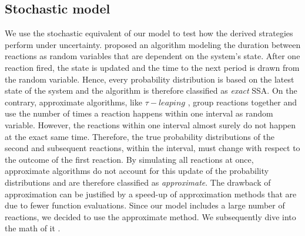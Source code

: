 \subsection{Stochastic model}
\label{sec:stochastic}
We use the stochastic equivalent of our model to test how the derived strategies perform under uncertainty. \citep{Gillespie.1977} proposed an algorithm modeling the duration between reactions as random variables that are dependent on the system's state. After one reaction fired, the state is updated and the time to the next period is drawn from the random variable. Hence, every probability distribution is based on the latest state of the system and the algorithm is therefore classified as \textit{exact} SSA.  
On the contrary, approximate algorithms, like $\tau-leaping$ \citep{Gillespie.2001}, group reactions together and use the number of times a reaction happens within one interval as random variable. However, the reactions within one interval almost surely do not happen at the exact same time. Therefore, the true probability distributions of the second and subsequent reactions, within the interval, must change with respect to the outcome of the first reaction. By simulating all reactions at once, approximate algorithms do not account for this update of the probability distributions and are therefore classified as \textit{approximate}. 
The drawback of approximation can be justified by a speed-up of approximation methods that are due to fewer function evaluations. Since our model includes a large number of reactions, we decided to use the approximate method. We subsequently dive into the math of it \citep{Gillespie.2001}.\\


